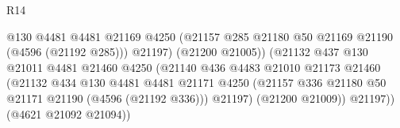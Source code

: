 \begin{lexlean}{R14}
\begin{coremodule}
                                                  @130
                                                  @4481
                                                  @4481
                                                  @21169
                                                  @4250
                                                  (@21157
                                                    @285
                                                    @21180
                                                    @50
                                                    @21169
                                                    @21190
                                                    (@4596 (@21192 @285)))
                                                  @21197)
                                                (@21200 @21005))
                                              (@21132
                                                @437
                                                @130
                                                @21011
                                                @4481
                                                @21460
                                                @4250
                                                (@21140
                                                  @436
                                                  @4483
                                                  @21010
                                                  @21173
                                                  @21460
                                                  (@21132
                                                    @434
                                                    @130
                                                    @4481
                                                    @4481
                                                    @21171
                                                    @4250
                                                    (@21157
                                                      @336
                                                      @21180
                                                      @50
                                                      @21171
                                                      @21190
                                                      (@4596 (@21192 @336)))
                                                    @21197)
                                                  (@21200 @21009))
                                                @21197))
                                            (@4621 @21092 @21094))

\end{coremodule}
\end{lexlean}
